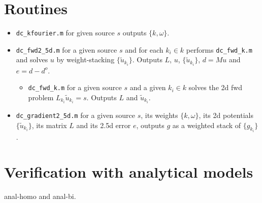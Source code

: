 \documentclass[a4paper,12pt]{article}
\begin{document}
\section*{Routines}
\begin{itemize}
\item \color{boiseBlue}\texttt{dc\_kfourier.m} \color{black} for given source $s$ outputs $\{k,\omega\}$.
\item \color{boiseBlue}\texttt{dc\_fwd2\_5d.m} \color{black} for a given source $s$ and for each $k_i\in k$ performs \color{rojoAmor}\texttt{dc\_fwd\_k.m} \color{black} and solves $u$ by weight-stacking $\{\tilde{u}_{k_i}\}$. Outputs $L$, $u$, $\{\tilde{u}_{k_i}\}$, $d=Mu$ and $e=d-d^o$.
%
\begin{itemize}
\item[\textbullet] \color{rojoAmor}\texttt{dc\_fwd\_k.m} \color{black} for a given source $s$ and a given $k_i\in k$ solves the 2d fwd problem $L_{k_i}\tilde{u}_{k_i}=s$. Outputs $L$ and $\tilde{u}_{k_i}$.
\end{itemize}
%
\item \color{boiseBlue}\texttt{dc\_gradient2\_5d.m} \color{black} for a given source $s$, its weights $\{k,\omega\}$, its 2d potentials $\{\tilde{u}_{k_i}\}$, its matrix $L$ and its 2.5d error $e$, outputs $g$ as a weighted stack of $\{g_{k_i}\}$.
\end{itemize}
%
\section*{Verification with analytical models}
anal-homo and anal-bi.
%


\end{document}
